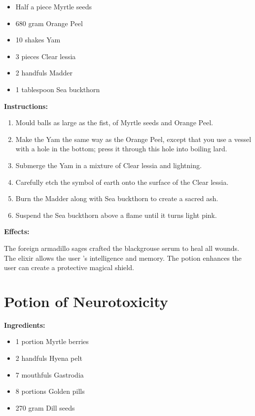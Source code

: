 \documentclass{article}
\begin{document}
\begin{itemize}
  \item Half a piece Myrtle seeds
  \item 680 gram Orange Peel
  \item 10 shakes Yam
  \item 3 pieces Clear lessia
  \item 2 handfuls Madder
  \item 1 tablespoon Sea buckthorn
\end{itemize}

\textbf{Instructions:}

\begin{enumerate}
  \item Mould balls as large as the fist, of Myrtle seeds and Orange Peel.
  \item Make the Yam the same way as the Orange Peel, except that you use a vessel with a hole in the bottom; press it through this hole into boiling lard.
  \item Submerge the Yam in a mixture of Clear lessia and lightning.
  \item Carefully etch the symbol of earth onto the surface of the Clear lessia.
  \item Burn the Madder along with Sea buckthorn to create a sacred ash.
  \item Suspend the Sea buckthorn above a flame until it turns light pink.
\end{enumerate}

\textbf{Effects:}

The foreign armadillo sages crafted the blackgrouse serum to heal all wounds. The elixir allows the user 's intelligence and memory. The potion enhances the user can create a protective magical shield.

\newpage
\section*{Potion of Neurotoxicity}

\textbf{Ingredients:}

\begin{itemize}
  \item 1 portion Myrtle berries
  \item 2 handfuls Hyena pelt
  \item 7 mouthfuls Gastrodia
  \item 8 portions Golden pills
  \item 270 gram Dill seeds
\end{itemize}
\end{document}
